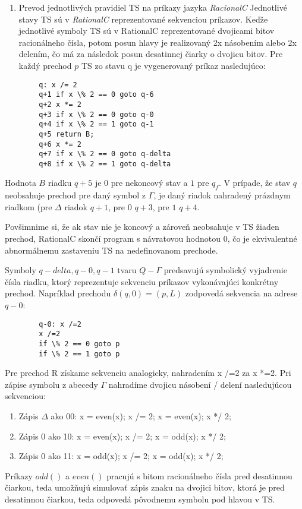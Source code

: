 \documentclass[10pt]{article}
\begin{document}
\begin{enumerate}
    \item Prevod jednotlivých pravidiel TS na príkazy jazyka \textit{RacionalC}
        Jednotlivé stavy TS sú v \textit{RationalC} reprezentované sekvenciou príkazov. 
        Keďže jednotlivé symboly TS sú v RationalC reprezentované dvojicami bitov racionálneho čísla, potom posun hlavy je
        realizovaný 2x násobením alebo 2x delením, čo má za následok posun desatinnej čiarky o
        dvojicu bitov.
        Pre každý prechod $p$ TS zo stavu q je vygenerovaný príkaz nasledujúco:
\end{enumerate}
        \begin{verbatim}
        q: x /= 2   
        q+1 if x \% 2 == 0 goto q-6 
        q+2 x *= 2
        q+3 if x \% 2 == 0 goto q-0 
        q+4 if x \% 2 == 1 goto q-1 
        q+5 return B;
        q+6 x *= 2
        q+7 if x \% 2 == 0 goto q-delta
        q+8 if x \% 2 == 1 goto q-delta
        \end{verbatim}
        Hodnota $B$ riadku $q+5$ je 0 pre nekoncový stav a $1$ pre $q_f$.
        V prípade, že stav $q$ neobsahuje prechod pre daný symbol z $\Gamma$, je daný riadok
        nahradený prázdnym riadkom (pre $\Delta$ riadok $q+1$, pre $0$ $q+3$, pre $1$ $q+4$.

        Povšimnime si, že ak stav nie je koncový a zároveň neobsahuje v TS žiaden prechod, RationalC
        skončí program s návratovou hodnotou 0, čo je ekvivalentné abnormálnemu zastaveniu TS na
        nedefinovanom prechode.

        Symboly $q-delta, q-0, q-1$ tvaru $Q-\Gamma$ predsavujú symbolický vyjadrenie čísla riadku, ktorý
        reprezentuje sekvenciu príkazov vykonávajúci konkrétny prechod.
        Napríklad prechodu $\delta(q, 0) = (p, L)$ zodpovedá sekvencia na adrese $q-0$:
        \begin{verbatim}
        q-0: x /=2
        x /=2
        if \% 2 == 0 goto p
        if \% 2 == 1 goto p
        \end{verbatim}
        Pre prechod R získame sekvenciu analogicky, nahradením x /=2 za x *=2.
        Pri zápise symbolu z abecedy $\Gamma$ nahradíme dvojicu násobení / delení nasledujúcou
        sekvenciou:
        \begin{enumerate}
            \item Zápis $\Delta$ ako 00: x = even(x); x /= 2; x = even(x); x */ 2;
            \item Zápis $0$ ako 10: x = even(x); x /= 2; x = odd(x); x */ 2;
            \item Zápis $0$ ako 11: x = odd(x); x /= 2; x = odd(x); x */ 2;
        \end{enumerate}
        Príkazy $odd()$ a $even()$ pracujú s bitom racionálneho čísla pred desatinnou čiarkou, teda
        umožňujú simulovať zápis znaku na dvojici bitov, ktorá je pred desatinnou čiarkou, teda
        odpovedá pôvodnemu symbolu pod hlavou v TS.
\end{document}
